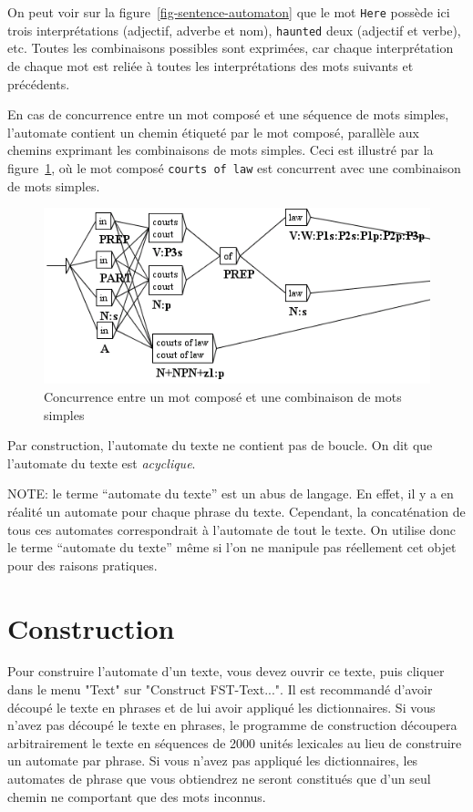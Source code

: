 \bigskip
\noindent On peut voir sur la figure~\ref{fig-sentence-automaton}
que le mot \verb+Here+ possède ici trois interprétations (adjectif, adverbe et nom),
\verb+haunted+ deux (adjectif et verbe), etc. Toutes les combinaisons possibles
sont exprimées, car chaque interprétation de chaque mot est reliée à toutes les interprétations
des mots suivants et précédents.


\bigskip
\noindent En cas de concurrence entre un mot composé et une séquence de mots simples, 
l’automate contient un chemin étiqueté par le mot composé, parallèle aux chemins exprimant
les combinaisons de mots simples. Ceci est illustré par la figure~\ref{fig-overlap}, 
où le mot composé \texttt{courts of law} est concurrent avec une combinaison de mots simples.

\begin{figure}[!ht]
\begin{center}
\includegraphics[width=12.5cm]{resources/img/fig7-2.png}
\caption{Concurrence entre un mot composé et une combinaison de mots simples\label{fig-overlap}}
\end{center}
\end{figure}

\bigskip
\noindent Par construction, l’automate du texte ne contient pas de boucle. On dit que l’automate
du texte est \textit{acyclique}.

\bigskip
\noindent NOTE: le terme ``automate du texte'' est un abus de langage. En effet, il y a en
réalité un automate pour chaque phrase du texte. Cependant, la concaténation de tous ces automates
correspondrait à l’automate de tout le texte. On utilise donc le terme ``automate du texte'' 
même si l’on ne manipule pas réellement cet objet pour des raisons pratiques.

\section{Construction}
Pour construire l’automate d’un texte, vous devez ouvrir ce texte, puis cliquer dans le menu "Text"
sur "Construct FST-Text...". Il est recommandé d’avoir découpé le texte en phrases et
de lui avoir appliqué les dictionnaires. Si vous n’avez pas découpé le texte en phrases, le
programme de construction découpera arbitrairement le texte en séquences de 2000 unités
lexicales au lieu de construire un automate par phrase. Si vous n’avez pas appliqué les 
dictionnaires, les automates de phrase que vous obtiendrez ne seront constitués que d’un seul
chemin ne comportant que des mots inconnus.



